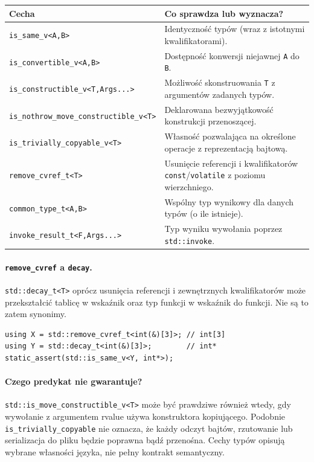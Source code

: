 \begin{center}
\small
\begin{tabular}{|>{\raggedright\arraybackslash}p{5.5cm}|>{\raggedright\arraybackslash}p{7.0cm}|}
\hline
\textbf{Cecha} & \textbf{Co sprawdza lub wyznacza?} \\
\hline
\texttt{is\_same\_v<A,B>} & Identyczność typów (wraz z istotnymi kwalifikatorami). \\
\hline
\texttt{is\_convertible\_v<A,B>} & Dostępność konwersji niejawnej \texttt{A} do \texttt{B}. \\
\hline
\texttt{is\_constructible\_v<T,Args...>} & Możliwość skonstruowania \texttt{T} z argumentów zadanych typów. \\
\hline
\texttt{is\_nothrow\_move\_}\newline\texttt{constructible\_v<T>} & Deklarowana bezwyjątkowość konstrukcji przenoszącej. \\
\hline
\texttt{is\_trivially\_copyable\_v<T>} & Własność pozwalająca na określone operacje z reprezentacją bajtową. \\
\hline
\texttt{remove\_cvref\_t<T>} & Usunięcie referencji i kwalifikatorów \texttt{const}/\texttt{volatile} z poziomu wierzchniego. \\
\hline
\texttt{common\_type\_t<A,B>} & Wspólny typ wynikowy dla danych typów (o ile istnieje). \\
\hline
\texttt{invoke\_result\_t<F,Args...>} & Typ wyniku wywołania poprzez \texttt{std::invoke}. \\
\hline
\end{tabular}
\end{center}

\paragraph{\texttt{remove\_cvref} a \texttt{decay}.}
\texttt{std::decay\_t<T>} oprócz usunięcia referencji i zewnętrznych
kwalifikatorów może przekształcić tablicę w wskaźnik oraz typ funkcji
w wskaźnik do funkcji. Nie są to zatem synonimy.

\begin{lstlisting}
using X = std::remove_cvref_t<int(&)[3]>; // int[3]
using Y = std::decay_t<int(&)[3]>;        // int*
static_assert(std::is_same_v<Y, int*>);
\end{lstlisting}

\paragraph{Czego predykat nie gwarantuje?}
\texttt{std::is\_move\_constructible\_v<T>} może być prawdziwe również
wtedy, gdy wywołanie z argumentem rvalue używa konstruktora kopiującego.
Podobnie \texttt{is\_trivially\_copyable} nie oznacza, że każdy odczyt
bajtów, rzutowanie lub serializacja do pliku będzie poprawna bądź
przenośna. Cechy typów opisują wybrane własności języka, nie
pełny kontrakt semantyczny.

